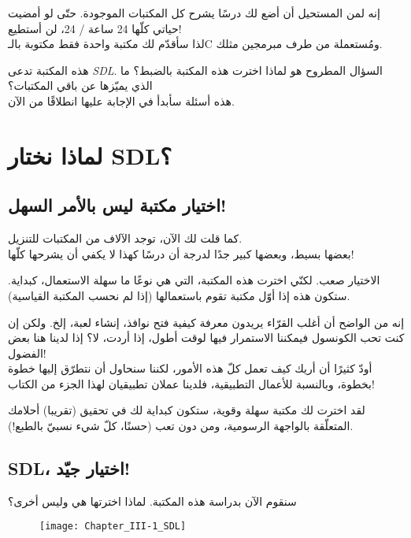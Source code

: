 إنه لمن المستحيل أن أضع لك درسًا يشرح كل المكتبات الموجودة. حتّى لو أمضيت حياتي كلّها 24 ساعة / 24، لن أستطيع!\\
لذا سأقدّم لك مكتبة واحدة فقط مكتوبة بالـ\textenglish{C} ومُستعملة من طرف مبرمجين مثلك. 

هذه المكتبة تدعى 
\textit{\textenglish{SDL}}.
السؤال المطروح هو لماذا اخترت هذه المكتبة بالضبط؟ ما الذي يميّزها عن باقي المكتبات؟\\
هذه أسئلة سأبدأ في الإجابة عليها انطلاقًا من الآن.

\section{لماذا نختار \textenglish{SDL}؟}

\subsection{اختيار مكتبة ليس بالأمر السهل!}

كما قلت لك الآن، توجد الآلاف من المكتبات للتنزيل.\\
بعضها بسيط، وبعضها كبير جدًا لدرجة أن درسًا كهذا لا يكفي أن يشرحها كلّها!

الاختيار صعب. لكنّي اخترت هذه المكتبة، التي هي نوعًا ما سهلة الاستعمال، كبداية. ستكون هذه إذا أوّل مكتبة تقوم باستعمالها (إذا لم نحسب المكتبة القياسية).

إنه من الواضح أن أغلب القرّاء يريدون معرفة كيفية فتح نوافذ، إنشاء لعبة، إلخ. ولكن إن كنت تحب الكونسول فيمكننا الاستمرار فيها لوقت أطول، إذا أردت، لا؟ إذا لدينا هنا بعض الفضول! \\
أودّ كثيرًا أن أريك كيف تعمل كلّ هذه الأمور، لكننا سنحاول أن نتطرّق إليها خطوة بخطوة، وبالنسبة للأعمال التطبيقية، فلدينا عملان تطبيقيان لهذا الجزء من الكتاب!

لقد اخترت لك مكتبة سهلة وقوية، ستكون كبداية لك في تحقيق (تقريبا) أحلامك المتعلّقة بالواجهة الرسومية، ومن دون تعب (حسنًا، كلّ شيء نسبيّ بالطبع!).
\subsection{\textenglish{SDL}، اختيار جيّد!}

سنقوم الآن بدراسة هذه المكتبة. لماذا اخترتها هي وليس أخرى؟

\begin{figure}[H]
	\centering
	\texttt{[image: Chapter\_III-1\_SDL]}
\end{figure}

